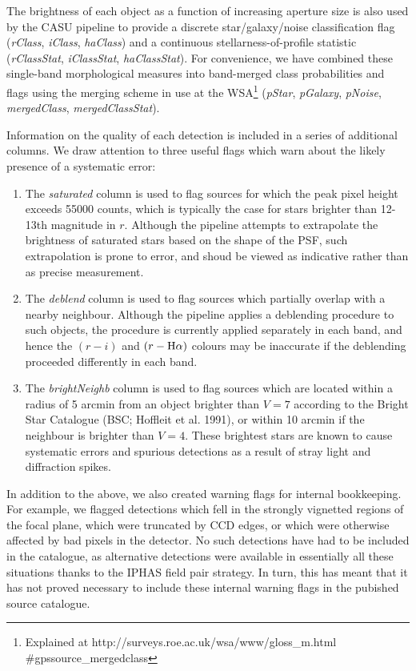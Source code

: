 \documentclass[useAMS,usenatbib]{mn2e}
\def\ha{\mbox{H$\rm \alpha$}}
\begin{document}
The brightness of each object as a function of increasing
aperture size is also used by the CASU pipeline to provide
a discrete star/galaxy/noise classification flag
(\emph{rClass}, \emph{iClass}, \emph{haClass})
and a continuous stellarness-of-profile statistic
(\emph{rClassStat}, \emph{iClassStat}, \emph{haClassStat}).
For convenience, we have combined
these single-band morphological measures
into band-merged class probabilities and flags
using the merging scheme in use at the WSA\footnote{Explained at
http://surveys.roe.ac.uk/wsa/www/gloss\_m.html \#gpssource\_mergedclass
} (\emph{pStar}, \emph{pGalaxy}, \emph{pNoise},
\emph{mergedClass}, \emph{mergedClassStat}).


Information on the quality of each detection is included 
in a series of additional columns.
We draw attention to three useful flags
which warn about the likely presence of a systematic error:
\begin{enumerate}
\item The \emph{saturated} column is used to flag sources
for which the peak pixel height exceeds 55000 counts,
which is typically the case for stars brighter than 12-13th magnitude in
$r$.  Although the pipeline attempts to extrapolate the brightness of
saturated stars based on the shape of the PSF,
such extrapolation is prone to error,
and shoud be viewed as indicative rather than as precise measurement.
\item The \emph{deblend} column is used to flag sources 
which partially overlap with a nearby neighbour.
Although the pipeline applies a deblending procedure
to such objects, the procedure is currently applied separately
in each band, and hence the $(r-i)$ and $(r-\ha)$ colours
may be inaccurate if the deblending proceeded differently in each band.
\item The \emph{brightNeighb} column is used to flag sources which are located
within a radius of 5 arcmin from an object brighter than $V=7$ 
according to the Bright Star Catalogue (BSC; Hoffleit et al. 1991), 
or within 10 arcmin if the neighbour is brighter than $V=4$.
These brightest stars are known to cause systematic errors
and spurious detections as a result of stray light 
and diffraction spikes.
\end{enumerate}
In addition to the above, we also created warning flags for internal bookkeeping.
For example, we flagged detections which fell in the strongly vignetted regions of the focal plane,
which were truncated by CCD edges,
or which were otherwise affected by bad pixels in the detector.
No such detections have had to be included in the catalogue, as 
alternative detections were available in essentially all these situations
thanks to the IPHAS field pair strategy. In turn, this has meant
that it has not proved necessary to include these internal warning flags
in the pubished source catalogue.
\end{document}
